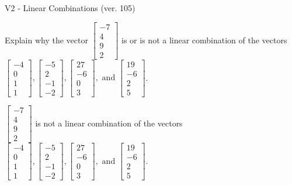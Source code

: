 \begin{exercise}
  \begin{exerciseTitle}V2 - Linear Combinations (ver. 105)\end{exerciseTitle}
  \begin{exerciseStatement}
    Explain why the vector \(\left[\begin{array}{c}
-7 \\
4 \\
9 \\
2
\end{array}\right]\)  is or is not a linear 
	combination of the vectors \(\left[\begin{array}{c}
-4 \\
0 \\
1 \\
1
\end{array}\right] , \left[\begin{array}{c}
-5 \\
2 \\
-1 \\
-2
\end{array}\right] , \left[\begin{array}{c}
27 \\
-6 \\
0 \\
3
\end{array}\right] , \text{ and } \left[\begin{array}{c}
19 \\
-6 \\
2 \\
5
\end{array}\right]\).
	


  \end{exerciseStatement}
  \begin{exerciseAnswer}
   \(\left[\begin{array}{c}
-7 \\
4 \\
9 \\
2
\end{array}\right]\) 
  	 is not  
	a linear combination of the vectors \(\left[\begin{array}{c}
-4 \\
0 \\
1 \\
1
\end{array}\right] , \left[\begin{array}{c}
-5 \\
2 \\
-1 \\
-2
\end{array}\right] , \left[\begin{array}{c}
27 \\
-6 \\
0 \\
3
\end{array}\right] , \text{ and } \left[\begin{array}{c}
19 \\
-6 \\
2 \\
5
\end{array}\right]\).


\end{exerciseAnswer}
\end{exercise}
